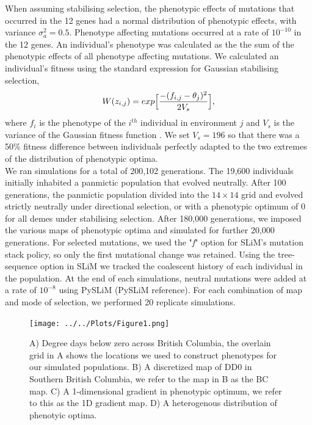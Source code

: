 \documentclass[10pt,twoside,lineno, twocolumn]{GSA_format}
\begin{document}
When assuming stabilising selection, the phenotypic effects of mutations that occurred in the 12 genes had a normal distribution of phenotypic effects, with variance $\sigma_a^2 = 0.5$. Phenotype affecting mutations occurred at a rate of $10^{-10}$ in the 12 genes. An individual's phenotype was calculated as the the sum of the phenotypic effects of all phenotype affecting mutations. We calculated an individual's fitness using the standard expression for Gaussian stabilising selection,
\begin{equation}
\notag
W(z_{i,j}) = exp \Big[\frac{-(f_{i,j} - \theta_j)^2}{2V_s}\Big],
\end{equation}
where $f_i$ is the phenotype of the $i^{th}$ individual in environment $j$ and $V_s$ is the variance of the Gaussian fitness function \citep{Walsh}. We set $V_s = 196$ so that there was a 50\% fitness difference between individuals perfectly adapted to the  two extremes of the distribution of phenotypic optima.\\ 

We ran simulations for a total of 200,102 generations. The 19,600 individuals initially inhabited a panmictic population that evolved neutrally. After 100 generations, the panmictic population divided into the $14\times14$ grid and evolved strictly neutrally under directional selection, or with a phenotypic optimum of 0 for all demes under stabilising selection. After 180,000 generations, we imposed the various maps of phenotypic optima and simulated for further 20,000 generations.  For selected mutations, we used the "\textit{f}" option for SLiM's mutation stack policy, so only the first mutational change was retained. Using the tree-sequence option in SLiM \citep{Haller2019-za} we tracked the coalescent history of each individual in the population. At the end of each simulations, neutral mutations were added at a rate of $10^{-8}$ using PySLiM (PySLiM reference). For each combination of map and mode of selection, we performed 20 replicate simulations. \\



\begin{figure}
  \texttt{[image: ../../Plots/Figure1.png]}
  \caption{A) Degree days below zero across British Columbia, the overlain grid in A shows the locations we used to construct phenotypes for our simulated populations. B) A discretized map of DD0 in Southern British Columbia, we refer to the map in B as the BC map. C) A 1-dimensional gradient in phenotypic optimum, we refer to this as the 1D gradient map. D) A heterogenous distribution of phenotyic optima.}
  
  \label{fig:envGridPlot}
\end{figure}
\end{document}
